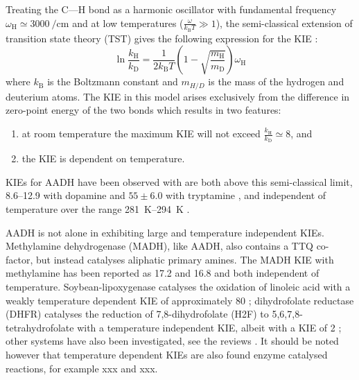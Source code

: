 Treating the C---H bond as a harmonic oscillator with fundamental frequency $\omega_{\mathrm{H}} \simeq \SI{3000}{\per\centi\meter}$ and at low temperatures ($\frac{\omega}{k_{\mathrm{B}}T} \gg 1$), the semi-classical extension of transition state theory (TST) gives the following expression for the KIE \cite{antoniouLargeKineticIsotope1997}:
\begin{equation}\label{eqn:tst_kie}
\ln \frac{k_{\mathrm{H}}}{k_{\mathrm{D}}}=\frac{1}{2k_{\mathrm{B}}T}\left(1-\sqrt{\frac{m_{\mathrm{H}}}{m_{\mathrm{D}}}}\right) \omega_{\mathrm{H}}
\end{equation}
where $k_{\mathrm{B}}$ is the Boltzmann constant and $m_{H/D}$ is the mass of the hydrogen and deuterium atoms. The KIE in this model arises exclusively from the difference in zero-point energy of the two bonds which results in two features:
\begin{enumerate}
    \item at room temperature the maximum KIE will not exceed $\frac{k_{\mathrm{H}}}{k_{\mathrm{D}}} \simeq 8$, and 
    \item the KIE is dependent on temperature. 
\end{enumerate}
KIEs for AADH have been observed with are both above this semi-classical limit,  \numrange[range-phrase=\text{--}]{8.6}{12.9} with dopamine\cite{basranImportanceBarrierShape2001a, hyunUnusuallyLargeIsotope1995a} and  $\num{55}\pm\num{6.0}$ with tryptamine \cite{masgrauAtomicDescriptionEnzyme2006}, and independent of temperature over the range \SIrange{281}{294}{\kelvin} \cite{masgrauAtomicDescriptionEnzyme2006}.

AADH is not alone in exhibiting large and temperature independent KIEs. Methylamine dehydrogenase (MADH), like AADH, also contains a TTQ co-factor, but instead catalyses aliphatic primary amines. The MADH KIE with methylamine has been reported as \num{17.2} \cite{brooksDeuteriumKineticIsotope1993} and \num{16.8} 
\cite{basranEnzymaticHTransferRequires1999} and both independent of temperature.  Soybean-lipoxygenase catalyses the oxidation of linoleic acid with a weakly temperature dependent KIE of approximately \num{80} \cite{glickmanExtremelyLargeIsotope1994, knappTemperatureDependentIsotopeEffects2002}; dihydrofolate reductase (DHFR) catalyses the reduction of 7,8-dihydrofolate
(H2F) to 5,6,7,8-tetrahydrofolate with a temperature independent KIE, albeit with a KIE of  \num{2} \cite{sikorskiTunnelingCoupledMotion2004, loveridgeSolventEffectsCatalysis2010a}; other systems have also been investigated, see the reviews \cite{klinmanHydrogenTunnelingLinks2013, puMultidimensionalTunnelingRecrossing2006}.  It should be noted however that temperature dependent KIEs are also found enzyme catalysed reactions, for example xxx and xxx. 


